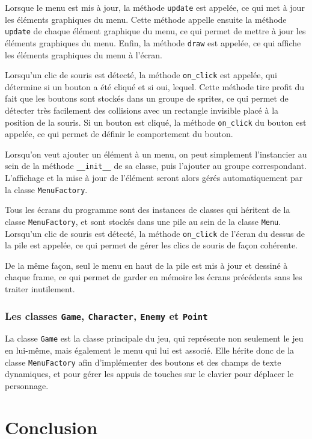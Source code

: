 \documentclass[12pt]{scrreprt} %
\begin{document}
Lorsque le menu est mis à jour, la méthode \texttt{update} est appelée, ce qui met à jour les éléments graphiques du menu. Cette méthode appelle ensuite la méthode \texttt{update} de chaque élément graphique du menu, ce qui permet de mettre à jour les éléments graphiques du menu. Enfin, la méthode \texttt{draw} est appelée, ce qui affiche les éléments graphiques du menu à l'écran.

Lorsqu'un clic de souris est détecté, la méthode \texttt{on\_click} est appelée, qui détermine si un bouton a été cliqué et si oui, lequel. Cette méthode tire profit du fait que les boutons sont stockés dans un groupe de sprites, ce qui permet de détecter très facilement des collisions avec un rectangle invisible placé à la position de la souris. Si un bouton est cliqué, la méthode \texttt{on\_click} du bouton est appelée, ce qui permet de définir le comportement du bouton.

Lorsqu'on veut ajouter un élément à un menu, on peut simplement l'instancier au sein de la méthode \texttt{\_\_init\_\_} de sa classe, puis l'ajouter au groupe correspondant. L'affichage et la mise à jour de l'élément seront alors gérés automatiquement par la classe \texttt{MenuFactory}.

Tous les écrans du programme sont des instances de classes qui héritent de la classe \texttt{MenuFactory}, et sont stockés dans une pile au sein de la classe \texttt{Menu}. Lorsqu'un clic de souris est détecté, la méthode \texttt{on\_click} de l'écran du dessus de la pile est appelée, ce qui permet de gérer les clics de souris de façon cohérente.

De la même façon, seul le menu en haut de la pile est mis à jour et dessiné à chaque frame, ce qui permet de garder en mémoire les écrans précédents sans les traiter inutilement.

\subsection{Les classes \texttt{Game}, \texttt{Character}, \texttt{Enemy} et \texttt{Point}}

La classe \texttt{Game} est la classe principale du jeu, qui représente non seulement le jeu en lui-même, mais également le menu qui lui est associé. Elle hérite donc de la classe \texttt{MenuFactory} afin d'implémenter des boutons et des champs de texte dynamiques, et pour gérer les appuis de touches sur le clavier pour déplacer le personnage.


\chapter*{Conclusion}
\end{document}

